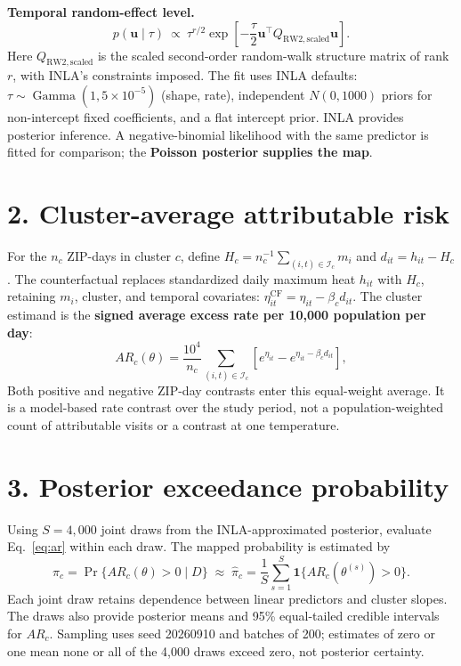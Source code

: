 \documentclass[10pt,letterpaper]{article}
\begin{document}
\textbf{Temporal random-effect level.}
\[
p(\mathbf u\mid\tau)\ \propto\
\tau^{r/2}\exp\!\left[-\frac{\tau}{2}\mathbf u^\top Q_{\mathrm{RW2,scaled}}\mathbf u\right].
\]
Here $Q_{\mathrm{RW2,scaled}}$ is the scaled second-order random-walk structure matrix of rank $r$, with INLA's constraints imposed. The fit uses INLA defaults: $\tau\sim\operatorname{Gamma}(1,5\times10^{-5})$ (shape, rate), independent $N(0,1000)$ priors for non-intercept fixed coefficients, and a flat intercept prior. INLA provides posterior inference. A negative-binomial likelihood with the same predictor is fitted for comparison; the \textbf{Poisson posterior supplies the map}.

\section*{2. Cluster-average attributable risk}
For the $n_c$ ZIP-days in cluster $c$, define $H_c=n_c^{-1}\sum_{(i,t)\in\mathcal I_c}m_i$ and $d_{it}=h_{it}-H_c$. The counterfactual replaces standardized daily maximum heat $h_{it}$ with $H_c$, retaining $m_i$, cluster, and temporal covariates: $\eta_{it}^{\mathrm{CF}}=\eta_{it}-\beta_c d_{it}$.
The cluster estimand is the \textbf{signed average excess rate per 10,000 population per day}:
\begin{equation}
AR_c(\theta)=\frac{10^4}{n_c}
\sum_{(i,t)\in\mathcal I_c}
\left[e^{\eta_{it}}-e^{\eta_{it}-\beta_c d_{it}}\right],
\label{eq:ar}
\end{equation}
Both positive and negative ZIP-day contrasts enter this equal-weight average. It is a model-based rate contrast over the study period, not a population-weighted count of attributable visits or a contrast at one temperature.

\newpage
\section*{3. Posterior exceedance probability}
Using $S=4{,}000$ joint draws from the INLA-approximated posterior, evaluate Eq.~\eqref{eq:ar} within each draw. The mapped probability is estimated by
\begin{equation}
\pi_c=\Pr\{AR_c(\theta)>0\mid D\}
\;\approx\;\widehat\pi_c=\frac{1}{S}\sum_{s=1}^{S}
\mathbf{1}\{AR_c(\theta^{(s)})>0\}.
\label{eq:mc}
\end{equation}
Each joint draw retains dependence between linear predictors and cluster slopes. The draws also provide posterior means and 95\% equal-tailed credible intervals for $AR_c$. Sampling uses seed 20260910 and batches of 200; estimates of zero or one mean none or all of the 4,000 draws exceed zero, not posterior certainty.
\end{document}
